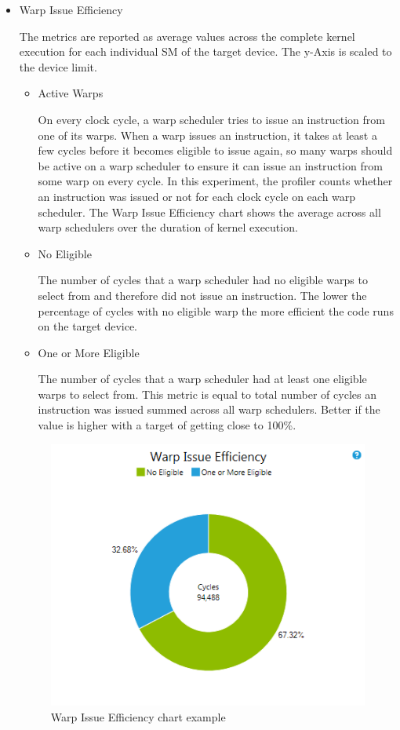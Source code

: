 \documentclass[oneside,openright,12pt,final,en]{mgr}
\begin{document}
\begin{itemize}
	\item Warp Issue Efficiency
	
	The metrics are reported as average values across the complete kernel execution for each individual SM of the target device. The y-Axis is scaled to the device limit.
	
	
	\begin{itemize}
		\item Active Warps  
		
		On every clock cycle, a warp scheduler tries to issue an instruction from one of its warps. When a warp issues an instruction, it takes at least a few cycles before it becomes eligible to issue again, so many warps should be active on a warp scheduler to ensure it can issue an instruction from some warp on every cycle. In this experiment, the profiler counts whether an instruction was issued or not for each clock cycle on each warp scheduler. The Warp Issue Efficiency chart shows the average across all warp schedulers over the duration of kernel execution. 
		
		\item No Eligible  
		
		The number of cycles that a warp scheduler had no eligible warps to select from and therefore did not issue an instruction. The lower the percentage of cycles with no eligible warp the more efficient the code runs on the target device.
		
		\item One or More Eligible
		
		The number of cycles that a warp scheduler had at least one eligible warps to select from. This metric is equal to total number of cycles an instruction was issued summed across all warp schedulers. Better if the value is higher with a target of getting close to 100\%.
		
	\end{itemize}
	
	\begin{figure}[H]
		\centering
		\includegraphics{IssueEfficiencyChartWarpIssueEfficiency}
		\caption{Warp Issue Efficiency chart example}
	\end{figure}





\end{itemize}
\end{document}
